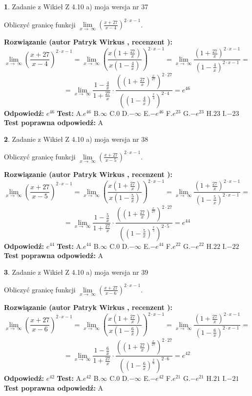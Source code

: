 \documentclass[12pt, a4paper]{article}
\theoremstyle{definition} %
\newtheorem{zad}{}
\newcommand{\zadStart}[1]{\begin{zad}#1\newline}
\newcommand{\zadStop}{\end{zad}}
\newcommand{\rozwStart}[2]{\noindent \textbf{Rozwiązanie (autor #1 , recenzent #2): }\newline}
\newcommand{\rozwStop}{\newline}
\newcommand{\odpStart}{\noindent \textbf{Odpowiedź:}\newline}
\newcommand{\odpStop}{\newline}
\newcommand{\testStart}{\noindent \textbf{Test:}\newline}
\newcommand{\testStop}{\newline}
\newcommand{\kluczStart}{\noindent \textbf{Test poprawna odpowiedź:}\newline}
\newcommand{\kluczStop}{\newline}
\begin{document}
\zadStart{Zadanie z Wikieł Z 4.10 a) moja wersja nr 37}

Obliczyć granicę funkcji  $\lim\limits_{x\to\ \infty}(\frac{x+27}{x-4})^{2\cdot x-1}$.
\zadStop
\rozwStart{Patryk Wirkus}{}
$$\lim\limits_{x\to\ \infty}(\frac{x+27}{x-4})^{2\cdot x-1} = \lim\limits_{x\to\ \infty}(\frac{x(1+\frac{27}{x})}{x(1-\frac{4}{x})})^{2\cdot x-1}=\lim\limits_{x\to\ \infty}\frac{(1+\frac{27}{x})^{2\cdot x-1}}{(1-\frac{4}{x})^{2\cdot x-1}}=$$
$$=\lim\limits_{x\to\ \infty}\frac{1-\frac{4}{x}}{1+\frac{27}{x}}\cdot\frac{((1+\frac{27}{x})^{\frac{x}{27}})^{2\cdot27}}{((1-\frac{4}{x})^{\frac{x}{4}})^{2\cdot4}}=e^{46}$$
\rozwStop
\odpStart
$e^{46}$
\odpStop
\testStart
A.$e^{46}$ B.$\infty$ C.$0$ D.$-\infty$ E.$-e^{46}$
F.$e^{23}$ G.$-e^{23}$
H.$23$
I.$-23$
\testStop
\kluczStart
A
\kluczStop



\zadStart{Zadanie z Wikieł Z 4.10 a) moja wersja nr 38}

Obliczyć granicę funkcji  $\lim\limits_{x\to\ \infty}(\frac{x+27}{x-5})^{2\cdot x-1}$.
\zadStop
\rozwStart{Patryk Wirkus}{}
$$\lim\limits_{x\to\ \infty}(\frac{x+27}{x-5})^{2\cdot x-1} = \lim\limits_{x\to\ \infty}(\frac{x(1+\frac{27}{x})}{x(1-\frac{5}{x})})^{2\cdot x-1}=\lim\limits_{x\to\ \infty}\frac{(1+\frac{27}{x})^{2\cdot x-1}}{(1-\frac{5}{x})^{2\cdot x-1}}=$$
$$=\lim\limits_{x\to\ \infty}\frac{1-\frac{5}{x}}{1+\frac{27}{x}}\cdot\frac{((1+\frac{27}{x})^{\frac{x}{27}})^{2\cdot27}}{((1-\frac{5}{x})^{\frac{x}{5}})^{2\cdot5}}=e^{44}$$
\rozwStop
\odpStart
$e^{44}$
\odpStop
\testStart
A.$e^{44}$ B.$\infty$ C.$0$ D.$-\infty$ E.$-e^{44}$
F.$e^{22}$ G.$-e^{22}$
H.$22$
I.$-22$
\testStop
\kluczStart
A
\kluczStop



\zadStart{Zadanie z Wikieł Z 4.10 a) moja wersja nr 39}

Obliczyć granicę funkcji  $\lim\limits_{x\to\ \infty}(\frac{x+27}{x-6})^{2\cdot x-1}$.
\zadStop
\rozwStart{Patryk Wirkus}{}
$$\lim\limits_{x\to\ \infty}(\frac{x+27}{x-6})^{2\cdot x-1} = \lim\limits_{x\to\ \infty}(\frac{x(1+\frac{27}{x})}{x(1-\frac{6}{x})})^{2\cdot x-1}=\lim\limits_{x\to\ \infty}\frac{(1+\frac{27}{x})^{2\cdot x-1}}{(1-\frac{6}{x})^{2\cdot x-1}}=$$
$$=\lim\limits_{x\to\ \infty}\frac{1-\frac{6}{x}}{1+\frac{27}{x}}\cdot\frac{((1+\frac{27}{x})^{\frac{x}{27}})^{2\cdot27}}{((1-\frac{6}{x})^{\frac{x}{6}})^{2\cdot6}}=e^{42}$$
\rozwStop
\odpStart
$e^{42}$
\odpStop
\testStart
A.$e^{42}$ B.$\infty$ C.$0$ D.$-\infty$ E.$-e^{42}$
F.$e^{21}$ G.$-e^{21}$
H.$21$
I.$-21$
\testStop
\kluczStart
A
\kluczStop
\end{document}
